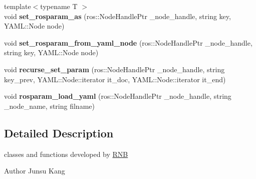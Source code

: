 \begin{DoxyCompactItemize}
{\footnotesize template$<$typename T $>$ }\\void {\bfseries set\+\_\+rosparam\+\_\+as} (ros\+::\+Node\+Handle\+Ptr \+\_\+node\+\_\+handle, string key, Y\+A\+M\+L\+::\+Node node)
\item 
\mbox{\label{namespace_r_n_b_a37d7c62bceba67474c275ce6e9c2b945}} 
void {\bfseries set\+\_\+rosparam\+\_\+from\+\_\+yaml\+\_\+node} (ros\+::\+Node\+Handle\+Ptr \+\_\+node\+\_\+handle, string key, Y\+A\+M\+L\+::\+Node node)
\item 
\mbox{\label{namespace_r_n_b_a15d2d962c15aaf3747369a0b7423a719}} 
void {\bfseries recurse\+\_\+set\+\_\+param} (ros\+::\+Node\+Handle\+Ptr \+\_\+node\+\_\+handle, string key\+\_\+prev, Y\+A\+M\+L\+::\+Node\+::iterator it\+\_\+doc, Y\+A\+M\+L\+::\+Node\+::iterator it\+\_\+end)
\item 
\mbox{\label{namespace_r_n_b_aabe7f4034b05aa2db32541f9c36b4198}} 
void {\bfseries rosparam\+\_\+load\+\_\+yaml} (ros\+::\+Node\+Handle\+Ptr \+\_\+node\+\_\+handle, string \+\_\+node\+\_\+name, string filname)
\end{DoxyCompactItemize}


\subsection{Detailed Description}
classes and functions developed by \hyperlink{namespace_r_n_b}{R\+NB} 

\begin{DoxyAuthor}{Author}
Junsu Kang 
\end{DoxyAuthor}
